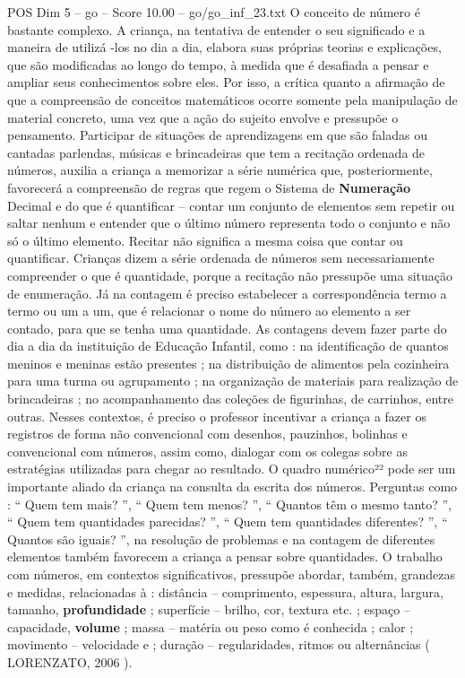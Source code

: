 \begin{textsample}{POS Dim 5 – go – Score 10.00 – go/go\_inf\_23.txt}
O conceito de número é bastante complexo.
A criança, na tentativa de entender o seu significado e a maneira de utilizá -los no dia a dia, elabora suas próprias teorias e explicações, que são modificadas ao longo do tempo, à medida que é desafiada a pensar e ampliar seus conhecimentos sobre eles.
Por isso, a crítica quanto a afirmação de que a compreensão de conceitos matemáticos ocorre somente pela manipulação de material concreto, uma vez que a ação do sujeito envolve e pressupõe o pensamento.
Participar de situações de aprendizagens em que são faladas ou cantadas parlendas, músicas e brincadeiras que tem a recitação ordenada de números, auxilia a criança a memorizar a série numérica que, posteriormente, favorecerá a compreensão de regras que regem o Sistema de \textbf{Numeração} Decimal e do que é quantificar – contar um conjunto de elementos sem repetir ou saltar nenhum e entender que o último número representa todo o conjunto e não só o último elemento.
Recitar não significa a mesma coisa que contar ou quantificar.
Crianças dizem a série ordenada de números sem necessariamente compreender o que é quantidade, porque a recitação não pressupõe uma situação de enumeração.
Já na contagem é preciso estabelecer a correspondência termo a termo ou um a um, que é relacionar o nome do número ao elemento a ser contado, para que se tenha uma quantidade.
As contagens devem fazer parte do dia a dia da instituição de Educação Infantil, como : na identificação de quantos meninos e meninas estão presentes ; na distribuição de alimentos pela cozinheira para uma turma ou agrupamento ; na organização de materiais para realização de brincadeiras ; no acompanhamento das coleções de figurinhas, de carrinhos, entre outras.
Nesses contextos, é preciso o professor incentivar a criança a fazer os registros de forma não convencional com desenhos, pauzinhos, bolinhas e convencional com números, assim como, dialogar com os colegas sobre as estratégias utilizadas para chegar ao resultado.
O quadro numérico²² pode ser um importante aliado da criança na consulta da escrita dos números.
Perguntas como : “ Quem tem mais? ”, “ Quem tem menos? ”, “ Quantos têm o mesmo tanto? ”, “ Quem tem quantidades parecidas? ”, “ Quem tem quantidades diferentes? ”, “ Quantos são iguais? ”, na resolução de problemas e na contagem de diferentes elementos também favorecem a criança a pensar sobre quantidades.
O trabalho com números, em contextos significativos, pressupõe abordar, também, grandezas e medidas, relacionadas à : distância – comprimento, espessura, altura, largura, tamanho, \textbf{profundidade} ; superfície – brilho, cor, textura etc. ; espaço – capacidade, \textbf{volume} ; massa – matéria ou peso como é conhecida ; calor ; movimento – velocidade e ; duração – regularidades, ritmos ou alternâncias ( LORENZATO, 2006 ).

\end{textsample}

